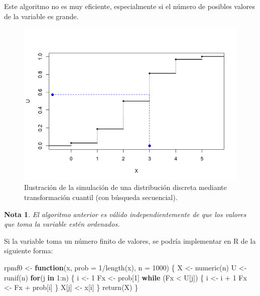 \documentclass[
]{book}
\newenvironment{Shaded}{\begin{snugshade}}{\end{snugshade}}
\newcommand{\AttributeTok}[1]{\textcolor[rgb]{0.77,0.63,0.00}{#1}}
\newcommand{\ControlFlowTok}[1]{\textcolor[rgb]{0.13,0.29,0.53}{\textbf{#1}}}
\newcommand{\DecValTok}[1]{\textcolor[rgb]{0.00,0.00,0.81}{#1}}
\newcommand{\FunctionTok}[1]{\textcolor[rgb]{0.00,0.00,0.00}{#1}}
\newcommand{\NormalTok}[1]{#1}
\newcommand{\OtherTok}[1]{\textcolor[rgb]{0.56,0.35,0.01}{#1}}
\newcommand{\SpecialCharTok}[1]{\textcolor[rgb]{0.00,0.00,0.00}{#1}}
\theoremstyle{break}
\theoremstyle{nonumberplain}
\newtheorem{remark}{Nota}
\begin{document}
Este algoritmo no es muy eficiente, especialmente si el número de posibles valores de la variable es grande.

\begin{figure}[!htb]

{\centering \includegraphics[width=0.8\linewidth]{images/cuantil-sim} 

}

\caption{Ilustración de la simulación de una distribución discreta mediante transformación cuantil (con búsqueda secuencial).}\label{fig:cuantil-movie}
\end{figure}

\begin{remark}
El algoritmo anterior es válido independientemente de que los valores que toma la variable estén ordenados.
\end{remark}

Si la variable toma un número finito de valores, se podría implementar en R de la siguiente forma:

\begin{Shaded}
\begin{Highlighting}[]
\NormalTok{rpmf0 }\OtherTok{\textless{}{-}} \ControlFlowTok{function}\NormalTok{(x, }\AttributeTok{prob =} \DecValTok{1}\SpecialCharTok{/}\FunctionTok{length}\NormalTok{(x), }\AttributeTok{n =} \DecValTok{1000}\NormalTok{) \{}
\NormalTok{  X }\OtherTok{\textless{}{-}} \FunctionTok{numeric}\NormalTok{(n)}
\NormalTok{  U }\OtherTok{\textless{}{-}} \FunctionTok{runif}\NormalTok{(n)}
  \ControlFlowTok{for}\NormalTok{(j }\ControlFlowTok{in} \DecValTok{1}\SpecialCharTok{:}\NormalTok{n) \{}
\NormalTok{    i }\OtherTok{\textless{}{-}} \DecValTok{1}
\NormalTok{    Fx }\OtherTok{\textless{}{-}}\NormalTok{ prob[}\DecValTok{1}\NormalTok{]}
    \ControlFlowTok{while}\NormalTok{ (Fx }\SpecialCharTok{\textless{}}\NormalTok{ U[j]) \{}
\NormalTok{      i }\OtherTok{\textless{}{-}}\NormalTok{ i }\SpecialCharTok{+} \DecValTok{1}
\NormalTok{      Fx }\OtherTok{\textless{}{-}}\NormalTok{ Fx }\SpecialCharTok{+}\NormalTok{ prob[i]}
\NormalTok{    \}}
\NormalTok{    X[j] }\OtherTok{\textless{}{-}}\NormalTok{ x[i]}
\NormalTok{  \}}
  \FunctionTok{return}\NormalTok{(X)}
\NormalTok{\}}
\end{Highlighting}
\end{Shaded}
\end{document}
